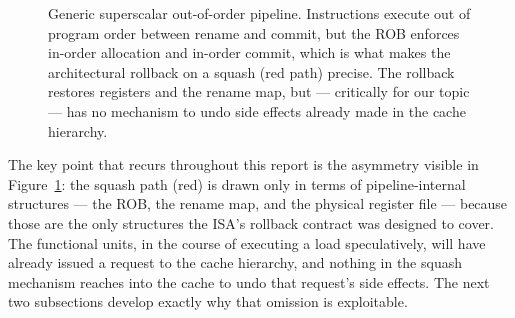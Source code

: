 \documentclass[11pt,a4paper]{article}
\begin{document}
\begin{figure}[h]
\centering
{}
\caption{Generic superscalar out-of-order pipeline. Instructions execute out
of program order between rename and commit, but the ROB enforces in-order
allocation and in-order commit, which is what makes the architectural rollback
on a squash (red path) precise. The rollback restores registers and the
rename map, but --- critically for our topic --- has no mechanism to undo
side effects already made in the cache hierarchy.}
\label{fig:pipeline}
\end{figure}

The key point that recurs throughout this report is the asymmetry visible in
Figure~\ref{fig:pipeline}: the squash path (red) is drawn only in terms of
pipeline-internal structures --- the ROB, the rename map, and the physical
register file --- because those are the only structures the ISA's rollback
contract was designed to cover. The functional units, in the course of
executing a load speculatively, will have already issued a request to the
cache hierarchy, and nothing in the squash mechanism reaches into the cache
to undo that request's side effects. The next two subsections develop
exactly why that omission is exploitable.
\end{document}
